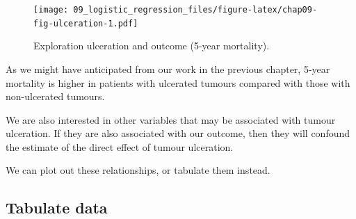 \documentclass[
  12pt,
  krantz2]{krantz}
\makeatletter
\newenvironment{Shaded}{\begin{snugshade}}{\end{snugshade}}
\newcommand{\DataTypeTok}[1]{\textcolor[rgb]{0.13,0.29,0.53}{#1}}
\newcommand{\KeywordTok}[1]{\textcolor[rgb]{0.13,0.29,0.53}{\textbf{#1}}}
\newcommand{\NormalTok}[1]{#1}
\newcommand{\OperatorTok}[1]{\textcolor[rgb]{0.81,0.36,0.00}{\textbf{#1}}}
\newcommand{\StringTok}[1]{\textcolor[rgb]{0.31,0.60,0.02}{#1}}
\newenvironment{kframe}{%
\medskip{}
\setlength{\fboxsep}{.8em}
 \def\at@end@of@kframe{}%
 \ifinner\ifhmode%
  \def\at@end@of@kframe{\end{minipage}}%
  \begin{minipage}{\columnwidth}%
 \fi\fi%
 \def\FrameCommand##1{\hskip\@totalleftmargin \hskip-\fboxsep
 \colorbox{shadecolor}{##1}\hskip-\fboxsep
     \hskip-\linewidth \hskip-\@totalleftmargin \hskip\columnwidth}%
 \MakeFramed {\advance\hsize-\width
   \@totalleftmargin\z@ \linewidth\hsize
   \@setminipage}}%
 {\par\unskip\endMakeFramed%
 \at@end@of@kframe}
\renewenvironment{Shaded}{\begin{kframe}}{\end{kframe}}
\makeatother
\begin{document}
\begin{Shaded}
\end{Shaded}

\begin{figure}
\centering
\texttt{[image: 09\_logistic\_regression\_files/figure-latex/chap09-fig-ulceration-1.pdf]}
\caption{\label{fig:chap09-fig-ulceration}Exploration ulceration and outcome (5-year mortality).}
\end{figure}

As we might have anticipated from our work in the previous chapter, 5-year mortality is higher in patients with ulcerated tumours compared with those with non-ulcerated tumours.

We are also interested in other variables that may be associated with tumour ulceration.
If they are also associated with our outcome, then they will confound the estimate of the direct effect of tumour ulceration.

We can plot out these relationships, or tabulate them instead.

\hypertarget{tabulate-data}{%
\subsection{Tabulate data}\label{tabulate-data}}
\end{document}

